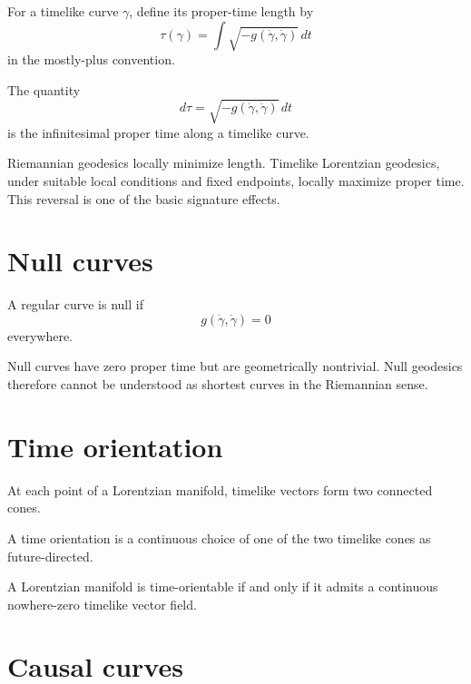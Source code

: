 For a timelike curve \(\gamma\), define its proper-time length by
\[
\tau(\gamma)
=
\int
\sqrt{-g(\dot\gamma,\dot\gamma)}\,dt
\]
in the mostly-plus convention.

\begin{definition}\label{def:vii30-proper-time}
The quantity
\[
d\tau=\sqrt{-g(\dot\gamma,\dot\gamma)}\,dt
\]
is the infinitesimal proper time along a timelike curve.
\end{definition}

\begin{remark}
Riemannian geodesics locally minimize length.  Timelike Lorentzian geodesics,
under suitable local conditions and fixed endpoints, locally maximize proper time.
This reversal is one of the basic signature effects.
\end{remark}

\section{Null curves}

\begin{definition}\label{def:vii30-null-curve}
A regular curve is null if
\[
g(\dot\gamma,\dot\gamma)=0
\]
everywhere.
\end{definition}

Null curves have zero proper time but are geometrically nontrivial.  Null geodesics
therefore cannot be understood as shortest curves in the Riemannian sense.

\section{Time orientation}

At each point of a Lorentzian manifold, timelike vectors form two connected cones.

\begin{definition}\label{def:vii30-time-orientation}
A time orientation is a continuous choice of one of the two timelike cones as
future-directed.
\end{definition}

\begin{proposition}[Criterion]\label{prop:vii30-time-orientable}
A Lorentzian manifold is time-orientable if and only if it admits a continuous
nowhere-zero timelike vector field.
\end{proposition}

\section{Causal curves}

